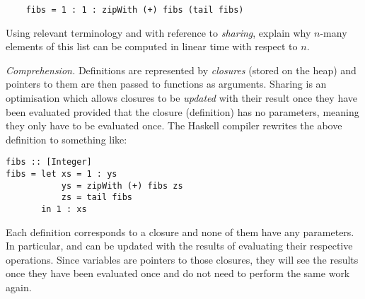 \begin{parts}
\begin{subparts}
\begin{small}
\begin{verbatim}
	fibs = 1 : 1 : zipWith (+) fibs (tail fibs)
	\end{verbatim}
\end{small}
Using relevant terminology and with reference to \emph{sharing}, explain why $n$-many elements of this list can be computed in linear time with respect to $n$. \droppoints
\begin{solution} \emph{Comprehension.}
Definitions are represented by \emph{closures} (stored on the heap) and pointers to them are then passed to functions as arguments. Sharing is an optimisation which allows closures to be \emph{updated} with their result once they have been evaluated provided that the closure (definition) has no parameters, meaning they only have to be evaluated once. The Haskell compiler rewrites the above definition to something like:
\begin{verbatim}
fibs :: [Integer]
fibs = let xs = 1 : ys 
           ys = zipWith (+) fibs zs
           zs = tail fibs
       in 1 : xs
\end{verbatim} 
Each definition corresponds to a closure and none of them have any parameters. In particular,  and  can be updated with the results of evaluating their respective operations. Since variables are pointers to those closures, they will see the results once they have been evaluated once and do not need to perform the same work again.
\end{solution}
\end{subparts}
\end{parts}
